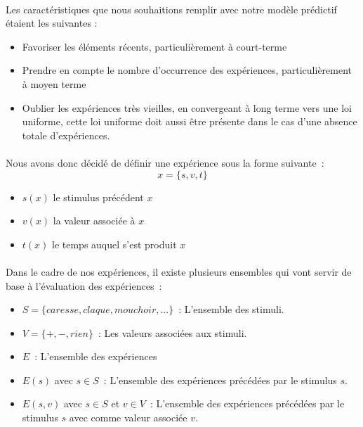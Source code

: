\paragraph{}
Les caractéristiques que nous souhaitions remplir avec notre modèle prédictif
étaient les suivantes :
\begin{itemize}
\item Favoriser les éléments récents, particulièrement à court-terme
\item Prendre en compte le nombre d'occurrence des expériences,
      particulièrement à moyen terme
\item Oublier les expériences très vieilles, en convergeant à long terme vers
      une loi uniforme, cette loi uniforme doit aussi être présente dans le
      cas d'une absence totale d'expériences.
\end{itemize}

\paragraph{}
Nous avons donc décidé de définir une expérience sous
la forme suivante~:
$$x = \{s, v, t\}$$
\begin{itemize}
\item $s(x)$ le stimulus précédent $x$
\item $v(x)$ la valeur associée à $x$
\item $t(x)$ le temps auquel s'est produit $x$
\end{itemize}

\paragraph{}
Dans le cadre de nos expériences, il existe plusieurs ensembles qui vont
servir de base à l'évaluation des expériences~:
\begin{itemize}
\item $S=\{caresse, claque, mouchoir, ...\}$~: L'ensemble des stimuli.
\item $V=\{+,-,rien\}$~: Les valeurs associées aux stimuli.
\item $E$~: L'ensemble des expériences
\item $E(s)$ avec $s \in S$~: L'ensemble des expériences précédées par le
      stimulus $s$.
\item $E(s,v)$ avec $s \in S$ et $v \in V$~: L'ensemble des expériences
      précédées par le stimulus $s$ avec comme valeur associée $v$.
\end{itemize}

